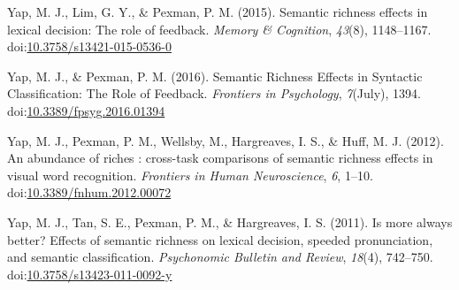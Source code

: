 \documentclass[english,,man]{apa6}
\begin{document}
\leavevmode\hypertarget{ref-Yap2015}{}%
Yap, M. J., Lim, G. Y., \& Pexman, P. M. (2015). Semantic richness effects in lexical decision: The role of feedback. \emph{Memory \& Cognition}, \emph{43}(8), 1148--1167. doi:\href{https://doi.org/10.3758/s13421-015-0536-0}{10.3758/s13421-015-0536-0}

\leavevmode\hypertarget{ref-Yap2016}{}%
Yap, M. J., \& Pexman, P. M. (2016). Semantic Richness Effects in Syntactic Classification: The Role of Feedback. \emph{Frontiers in Psychology}, \emph{7}(July), 1394. doi:\href{https://doi.org/10.3389/fpsyg.2016.01394}{10.3389/fpsyg.2016.01394}

\leavevmode\hypertarget{ref-Yap2012}{}%
Yap, M. J., Pexman, P. M., Wellsby, M., Hargreaves, I. S., \& Huff, M. J. (2012). An abundance of riches : cross-task comparisons of semantic richness effects in visual word recognition. \emph{Frontiers in Human Neuroscience}, \emph{6}, 1--10. doi:\href{https://doi.org/10.3389/fnhum.2012.00072}{10.3389/fnhum.2012.00072}

\leavevmode\hypertarget{ref-Yap2011}{}%
Yap, M. J., Tan, S. E., Pexman, P. M., \& Hargreaves, I. S. (2011). Is more always better? Effects of semantic richness on lexical decision, speeded pronunciation, and semantic classification. \emph{Psychonomic Bulletin and Review}, \emph{18}(4), 742--750. doi:\href{https://doi.org/10.3758/s13423-011-0092-y}{10.3758/s13423-011-0092-y}
\end{document}
